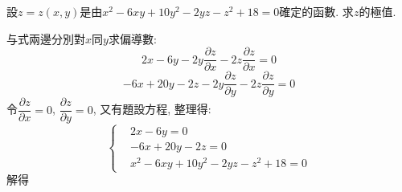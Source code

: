 \begin{problem}
設$z = z(x, y)$是由$x^2 - 6xy + 10y^2 - 2yz - z^2 + 18 = 0$確定的函數. 求$z$的極值.
\end{problem}

\begin{solve}
    与式兩邊分別對$x$同$y$求偏導數:
    $$ 2x - 6y -2y\dfrac{\partial z}{\partial x} - 2z\dfrac{\partial z}{\partial x} = 0    $$
    $$ -6x + 20y - 2z - 2y\dfrac{\partial z}{\partial y} - 2z\dfrac{\partial z}{\partial y} = 0$$
    令$\dfrac{\partial z}{\partial x} = 0$, $\dfrac{\partial z}{\partial y} = 0$, 又有題設方程, 整理得:
    $$
        \begin{cases}
             & 2x - 6y = 0                            \\
             & -6x +20y - 2z  = 0                     \\
             & x^2 - 6xy + 10y^2 - 2yz - z^2 + 18 = 0
        \end{cases}
    $$
    解得




\end{solve}